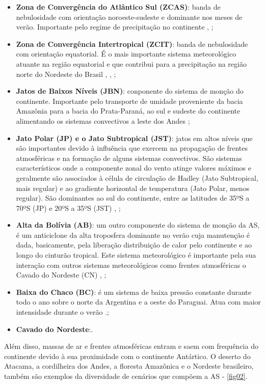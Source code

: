 \begin{itemize}
\item \textbf{Zona de Convergência do Atlântico Sul (ZCAS)}: banda de nebulosidade com orientação noroeste-sudeste e dominante nos meses de verão. Importante pelo regime de precipitação no continente \cite{kodama92a}, \cite{kodama92b};
\item \textbf{Zona de Convergência Intertropical (ZCIT)}: banda de nebulosidade com orientação equatorial. É o mais importante sistema meteorológico a\-tu\-an\-te na região equatorial e que contribui para a precipitação na região norte do Nordeste do Brasil \cite{hastenrathheller77}, \cite{uvonobre89a}, \cite{uvonobre89b};
\item \textbf{Jatos de Baixos Níveis (JBN)}: conponente do sistema de monção do continente. Importante pelo transporte de umidade proveniente da bacia Amazônia para a bacia do Prata-Paraná, ao sul e sudeste do continente alimentando os sistemas convectivos a leste dos Andes \cite{bonner68};
\item \textbf{Jato Polar (JP) e o Jato Subtropical (JST)}: jatos em altos níveis que são importantes devido à influência que exercem na propagação de frentes atmosféricas e na formação de alguns sistemas convectivos. São sistemas característicos onde a componente zonal do vento atinge valores máximos e geralmente são associados à célula de circulação de Hadley (Jato Subtropical, mais regular) e ao gradiente horizontal de temperatura (Jato Polar, menos regular). São dominantes ao sul do continente, entre as latitudes de 35ºS a 70ºS (JP) e  20ºS a 35ºS (JST) \cite{reiter69}, \cite{riehl69};
\item \textbf{Alta da Bolívia (AB)}: um outro componente do sistema de monção da AS, é um anticiclone da alta troposfera dominante no verão cuja manutenção é dada, basicamente, pela liberação distribuição de calor pelo continente e ao longo do cinturão tropical. Este sistema meteorológico é importante pela sua interação com outros sistemas meteorológicos como frentes atmosféricas o Cavado do Nordeste (CN) \cite{carvalho89}, \cite{oliveira86};
\item \textbf{Baixa do Chaco (BC)}: é um sistema de baixa pressão constante durante todo o ano sobre o norte da Argentina e a oeste do Paraguai. Atua com maior intensidade durante o verão \cite{grimmetal04}.;
\item \textbf{Cavado do Nordeste}:.
\end{itemize}

Além disso, massas de ar e frentes atmosféricas entram e saem com frequência do continente devido à sua proximidade com o continente Antártico. O deserto do Atacama, a cordilheira dos Andes, a floresta Amazônica e o Nordeste brasileiro, também são exemplos da diversidade de cenários que compõem a AS - \autoref{fig02}.

